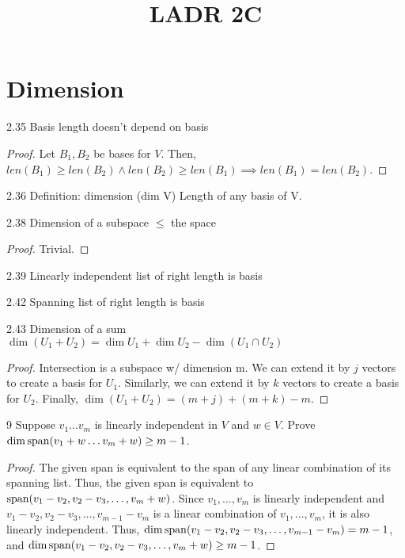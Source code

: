 \documentclass[12pt, letterpaper]{article}
\title{LADR 2C}
\begin{document}
\maketitle

\section*{Dimension}

\begin{imp}
{2.35 Basis length doesn't depend on basis}  
\begin{proof}
Let $B_1,B_2$ be bases for $V$. 
Then, $len(B_1)\geq len(B_2) \land len(B_2)\geq len(B_1)\implies len(B_1)=len(B_2)$.
\end{proof}
\end{imp}

\begin{imp}
{2.36 Definition: dimension (dim V)}
Length of any basis of V.
\end{imp}

\begin{imp}
{2.38 Dimension of a subspace $\leq$ the space}
\begin{proof}
Trivial.
\end{proof}
\end{imp}

\begin{imp}
{2.39 Linearly independent list of right length is basis}
\end{imp}

\begin{imp}
{2.42 Spanning list of right length is basis}
\end{imp}

\begin{imp}
{2.43 Dimension of a sum}
$\dim(U_1+U_2)=\dim U_1+\dim U_2-\dim(U_1\cap U_2)$
\begin{proof}
Intersection is a subspace w/ dimension m. We can extend it by $j$ vectors 
to create a basis for $U_1$. Similarly, we can extend it by $k$ vectors
to create a basis for $U_2$. Finally, $\dim(U_1+U_2)=(m+j)+(m+k)-m$.
\end{proof}
\end{imp}

\begin{problem}
{9}
Suppose $v_1\dots v_m$ is linearly independent in $V$ and $w\in V$.
Prove $\dim\operatorname{span}(v_1+w\dots v_m+w)\geq m-1$.
\end{problem}
\begin{proof}
The given span is equivalent to the span of any linear combination of its spanning list.
Thus, the given span is equivalent to $\operatorname{span}(v_1-v_2,v_2-v_3,\dots,v_m+w)$.
Since $v_1,\dots,v_m$ is linearly independent and 
$v_1-v_2,v_2-v_3,\dots,v_{m-1}-v_m$ is a linear combination of $v_1,\dots,v_m$,
it is also linearly independent. 
Thus, $\dim\operatorname{span}(v_1-v_2,v_2-v_3,\dots,v_{m-1}-v_m) = m-1$,
and $\dim\operatorname{span}(v_1-v_2,v_2-v_3,\dots,v_m+w) \geq m-1$.
\end{proof}
\end{document}
